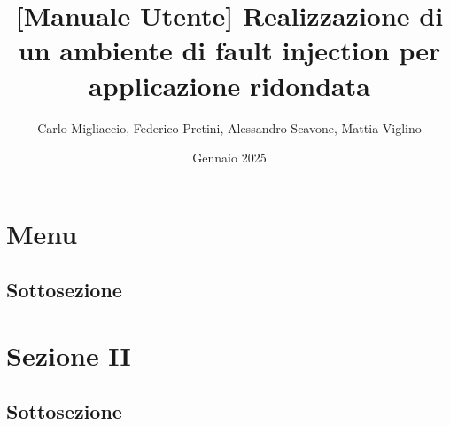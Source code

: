 \documentclass[a4paper]{article}
\title{
    \textbf{
    [Manuale Utente] Realizzazione di un ambiente di fault injection per applicazione ridondata}
}
\author{Carlo Migliaccio, Federico Pretini, Alessandro Scavone, Mattia  Viglino}
\date{
    Gennaio 2025
}
\begin{document}
    \maketitle
    \tableofcontents
    \newpage 

    \section{Menu}
    \subsection{Sottosezione}

    \section{Sezione II}
    \subsection{Sottosezione}
\end{document}
